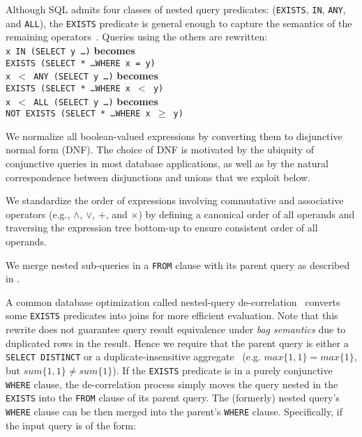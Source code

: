 Although SQL admits four classes of nested query predicates: (\texttt{EXISTS}, \texttt{IN}, \texttt{ANY}, and \texttt{ALL}), the \texttt{EXISTS} predicate is general enough to capture the semantics of the remaining operators~\cite{Chandra:2016:PMA:3007263.3007304}.  Queries using the others are rewritten:\\
\noindent \texttt{x IN (SELECT y \ldots)} \textbf{becomes} \\\hspace*{22.5mm}\texttt{EXISTS (SELECT * \ldots WHERE x = y)}\\
\noindent \texttt{x $<$ ANY (SELECT y \ldots)} \textbf{becomes}  \\\hspace*{22.5mm}\texttt{EXISTS (SELECT * \ldots WHERE x $<$ y)}\\
\noindent \texttt{x $<$ ALL (SELECT y \ldots)} \textbf{becomes}  \\\hspace*{14.5mm}\texttt{NOT EXISTS (SELECT * \ldots WHERE x $\geq$ y)}

We normalize all boolean-valued expressions by converting them to disjunctive normal form (DNF).  The choice of DNF is motivated by the ubiquity of conjunctive queries in most database applications, as well as by the natural correspondence between disjunctions and unions that we exploit below.

We standardize the order of expressions involving commutative and associative operators (e.g., $\wedge$, $\vee$, $+$, and $\times$) by defining a canonical order of all operands and traversing the expression tree bottom-up to ensure consistent order of all operands.


We merge nested sub-queries in a \texttt{FROM} clause with its parent query as described in \cite{Chandra:2016:PMA:3007263.3007304}.

A common database optimization called nested-query de-correlation~\cite{492194} converts some \texttt{EXISTS} predicates into joins for more efficient evaluation. 
Note that this rewrite does not guarantee query result equivalence under \textit{bag semantics} due to duplicated rows in the result.
Hence we require that the parent query is either a \texttt{SELECT DISTINCT} or a duplicate-insensitive aggregate~\cite{ilprints101} (e.g. $max\{1,1\}=max\{1\}$, but $sum\{1,1\}\neq sum\{1\}$).
If the \texttt{EXISTS} predicate is in a purely conjunctive \texttt{WHERE} clause, the de-correlation process simply moves the query nested in the \texttt{EXISTS} into the \texttt{FROM} clause of its parent query. 
The (formerly) nested query's \texttt{WHERE} clause can be then merged into the parent's \texttt{WHERE} clause. 
Specifically, if the input query is of the form:

